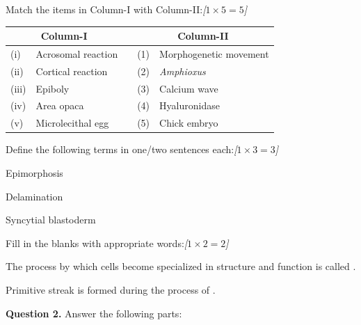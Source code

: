\documentclass[11pt,a4paper]{article}
\newcommand{\pts}[1]{\hfill   \textit{[#1]}}
\begin{document}
\begin{parts}
  \item Match the items in Column-I with Column-II:\pts{$1  \times 5 = 5$}
  
  
\begin{center}
  
\begin{tabular}{llp{1cm}ll}
    \hline
    \multicolumn{2}{c}{   \textbf{Column-I}} & & \multicolumn{2}{c}{   \textbf{Column-II}} \\
    \hline
    (i) & Acrosomal reaction & & (1) & Morphogenetic movement \\
    (ii) & Cortical reaction & & (2) &   \textit{Amphioxus} \\
    (iii) & Epiboly & & (3) & Calcium wave \\
    (iv) & Area opaca & & (4) & Hyaluronidase \\
    (v) & Microlecithal egg & & (5) & Chick embryo \\
    \hline
  \end{tabular}
  \end{center}

  \item Define the following terms in one/two sentences each:\pts{$1  \times 3 = 3$}
  
\begin{parts}
    \item Epimorphosis
    \item Delamination
    \item Syncytial blastoderm
  \end{parts}

  \item Fill in the blanks with appropriate words:\pts{$1  \times 2 = 2$}
  
\begin{parts}
    \item The process by which cells become specialized in structure and function is called \makebox[3cm]{\hrulefill}.
    \item Primitive streak is formed during the process of \makebox[3cm]{\hrulefill}.
  \end{parts}
\end{parts}

\medskip


\noindent   \textbf{Question 2.} Answer the following parts:
\end{document}
